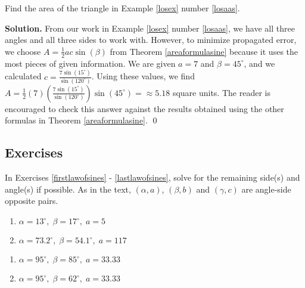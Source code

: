 \smallskip

\begin{ex} \label{areaformulasineex}  Find the area of the triangle in Example \ref{losex} number \ref{losaas}.

\smallskip

{\bf Solution.} From our work in  Example \ref{losex} number \ref{losaas}, we have all three angles and all three sides to work with.  However, to minimize propagated error, we choose $A = \frac{1}{2} ac \sin(\beta)$ from Theorem \ref{areaformulasine} because it uses the most pieces of given information.  We are given  $a = 7$ and $\beta = 45^{\circ}$, and we calculated $c = \frac{7\sin\left(15^{\circ}\right)}{\sin\left(120^{\circ}\right)}$.   Using these values, we find $A =  \frac{1}{2}(7)\left(\frac{7\sin\left(15^{\circ}\right)}{\sin\left(120^{\circ}\right)} \right) \sin\left(45^{\circ}\right) =  \approx 5.18$ square units. The reader is encouraged to check this answer against the results obtained using the other formulas in Theorem \ref{areaformulasine}. \qed

\end{ex}

\newpage

\subsection{Exercises}

In Exercises \ref{firstlawofsines} - \ref{lastlawofsines}, solve for the remaining side(s) and angle(s) if possible.  As in the text, $(\alpha, a)$, $(\beta, b)$ and $(\gamma, c)$ are angle-side opposite pairs.

\begin{multicols}{2}

\begin{enumerate}

\item $\alpha = 13^{\circ}, \; \beta = 17^{\circ}, \; a = 5$ \label{firstlawofsines}
\item $\alpha = 73.2^{\circ}, \; \beta = 54.1^{\circ}, \; a = 117$

\setcounter{HW}{\value{enumi}}

\end{enumerate}

\end{multicols}

\begin{multicols}{2} 

\begin{enumerate}

\setcounter{enumi}{\value{HW}}

\item $\alpha = 95^{\circ}, \; \beta = 85^{\circ}, \; a = 33.33$
\item $\alpha = 95^{\circ}, \; \beta = 62^{\circ}, \; a = 33.33$

\setcounter{HW}{\value{enumi}}

\end{enumerate}

\end{multicols}

